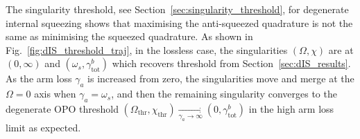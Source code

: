The singularity threshold, see Section~\ref{sec:singularity_threshold}, for degenerate internal squeezing shows that maximising the anti-squeezed quadrature is not the same as minimising the squeezed quadrature.
As shown in Fig.~\ref{fig:dIS_threshold_traj}, in the lossless case, the singularities $(\Omega,\chi)$ are at $(0,\infty)$ and $(\omega_s,\gamma^b_\text{tot})$ which recovers threshold from Section~\ref{sec:dIS_results}. %
As the arm loss $\gamma_a$ is increased from zero, the singularities move and merge at the $\Omega=0$ axis when $\gamma_a=\omega_s$, and then the remaining singularity converges to the degenerate OPO threshold $(\Omega_\text{thr},\chi_\text{thr})\xrightarrow[\gamma_a\rightarrow\infty]{}(0,\gamma^b_\mathrm{tot})$ in the high arm loss limit as expected.
